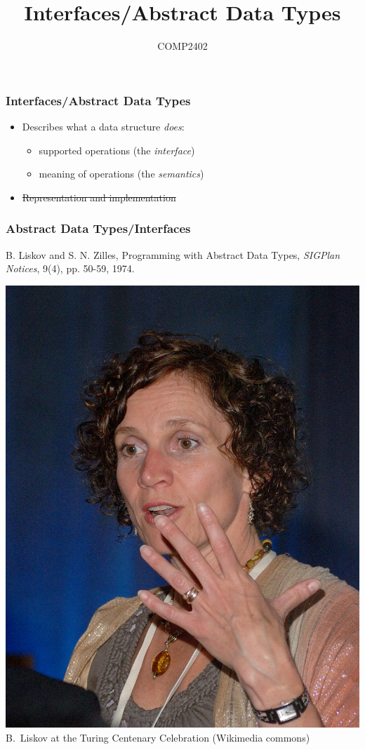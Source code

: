 \documentclass[aspectratio=169,xcolor=dvipsnames]{beamer}
\title{Interfaces/Abstract Data Types}
\author{COMP2402}
\date{}
\renewcommand{\emph}[1]{{\itshape\color{blue}#1}}
\begin{document}
\begin{frame}
  \titlepage
\end{frame}

\begin{frame}
  \frametitle{Interfaces/Abstract Data Types}
 
  \begin{itemize}
   \item<+->Describes what a data structure \emph{does}:
     \begin{itemize}
        \item<+->supported operations (the \emph{interface})
        \item<+->meaning of operations (the \emph{semantics})
     \end{itemize}
   \item<+-> \sout{Representation and implementation}
        \end{itemize}
\end{frame}

\begin{frame}
  \frametitle{Abstract Data Types/Interfaces}

   B. Liskov and S. N. Zilles, Programming with Abstract Data Types, \emph{SIGPlan Notices}, 9(4), pp. 50-59, 1974.\\
  \begin{center}
   \includegraphics[height=.6\textheight]{images/liskov}\\
   B.~Liskov at the Turing Centenary Celebration (Wikimedia commons)
  \end{center}
\end{frame}
\end{document}
